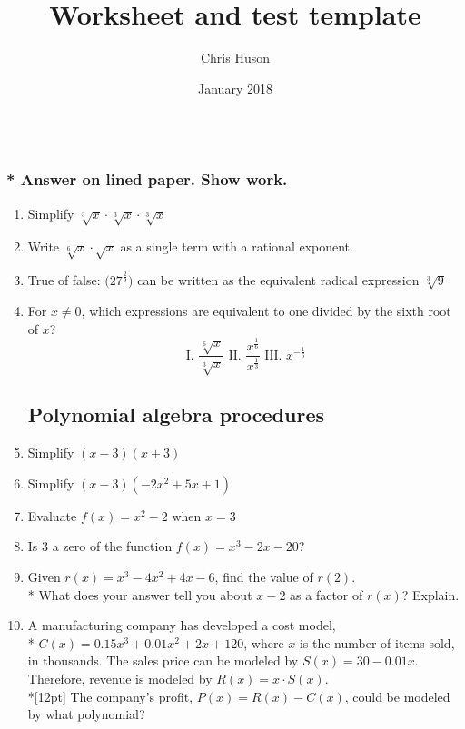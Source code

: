 \documentclass[12pt, oneside]{article}
\title{Worksheet and test template}
\author{Chris Huson}
\date{January 2018}
\begin{document}
\subsubsection*{\\* Answer on lined paper. Show work.}

\begin{enumerate}

\vspace{0.5 cm}

\subsection*{Rational exponents and radicals}

\item Simplify $\sqrt[3]{x} \cdot \sqrt[3]{x} \cdot \sqrt[3]{x}$ 
\item Write $\sqrt[6]{x} \cdot \sqrt{x}$ as a single term with a rational exponent.

\item True of false:  $\displaystyle \big( 27^\frac{2}{9} \big) $ can be written as the equivalent radical expression $\sqrt[3]9$

\item For $x \neq 0$, which expressions are equivalent to one divided by the sixth root of $x$?
\[ \text{I. } \frac{\sqrt[6]{x}}{\sqrt[3]{x}} \text{  II. } \frac{x^{\frac{1}{6}}}{x^{\frac{1}{3}}} \text{  III. } x^{-\frac{1}{6}} \]

\subsection*{Polynomial algebra procedures}
\item Simplify $(x-3)(x+3)$
\item Simplify $(x-3)(-2x^2+5x+1)$
\item Evaluate $f(x)=x^2-2$ when $x=3$
\item Is 3 a zero of the function $f(x)=x^3-2x-20$?

\item Given $r(x)=x^3-4x^2+4x-6$, find the value of $r(2)$.\\*
What does your answer tell you about $x-2$ as a factor of $r(x)$? Explain.

\item A manufacturing company has developed a cost model,\\* $C(x)=0.15x^3 +0.01x^2+2x+120$, where $x$ is the number of items sold, in thousands. The sales price can be modeled by $S(x)=30-0.01x$. Therefore, revenue is modeled by $R(x)=x \cdot S(x)$.\\*[12pt]
The company’s profit, $P(x)=R(x)-C(x)$, could be modeled by what polynomial?


\end{enumerate}
\end{document}
